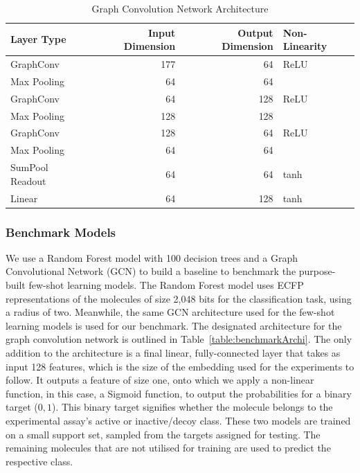 \begin{table}
    \centering
    \begin{tabular}{@{}lrrl@{}}
    \hline
    \textbf{Layer Type} & \textbf{Input Dimension} & \textbf{Output Dimension} & \textbf{Non-Linearity} \\
    \hline
    GraphConv & 177 & 64 & ReLU \\
    Max Pooling & 64 & 64 & \\
    GraphConv & 64 & 128 & ReLU \\
    Max Pooling & 128 & 128 & \\
    GraphConv & 128 & 64 & ReLU \\
    Max Pooling & 64 & 64 & \\
    SumPool Readout & 64 & 64 & tanh \\
    Linear & 64 & 128 & tanh \\
    \hline  
    \end{tabular}
    \caption{Graph Convolution Network Architecture}
    \label{table:gcn-architecture}
\end{table}

\subsubsection{Benchmark Models}

We use a Random Forest model with 100 decision trees and a Graph Convolutional Network (GCN) to build a baseline to benchmark the purpose-built few-shot learning models. The Random Forest model uses ECFP representations of the molecules of size 2,048 bits for the classification task, using a radius of two. Meanwhile, the same GCN architecture used for the few-shot learning models is used for our benchmark. The designated architecture for the graph convolution network is outlined in Table~\ref{table:benchmarkArchi}. The only addition to the architecture is a final linear, fully-connected layer that takes as input 128 features, which is the size of the embedding used for the experiments to follow. It outputs a feature of size one, onto which we apply a non-linear function, in this case, a Sigmoid function, to output the probabilities for a binary target (${0, 1}$). This binary target signifies whether the molecule belongs to the experimental assay's active or inactive/decoy class. These two models are trained on a small support set, sampled from the targets assigned for testing. The remaining molecules that are not utilised for training are used to predict the respective class.


